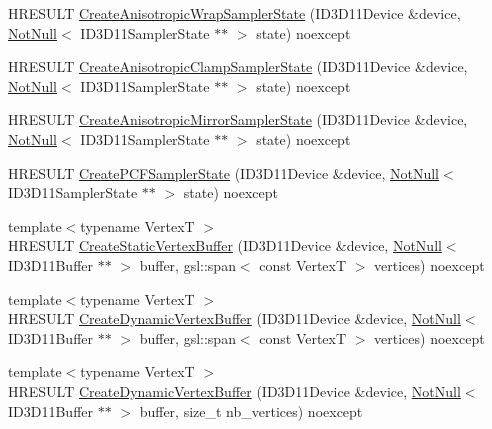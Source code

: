 \begin{DoxyCompactItemize}
\item 
H\+R\+E\+S\+U\+LT \mbox{\hyperlink{namespacemage_1_1rendering_a095bd9e1ca72cd2a27c49f901bb4ea89}{Create\+Anisotropic\+Wrap\+Sampler\+State}} (I\+D3\+D11\+Device \&device, \mbox{\hyperlink{namespacemage_a8769f9d670d6b585ea306cb1062af94b}{Not\+Null}}$<$ I\+D3\+D11\+Sampler\+State $\ast$$\ast$ $>$ state) noexcept
\item 
H\+R\+E\+S\+U\+LT \mbox{\hyperlink{namespacemage_1_1rendering_a84f8d95cd6a9774ff39ee3ec278973ae}{Create\+Anisotropic\+Clamp\+Sampler\+State}} (I\+D3\+D11\+Device \&device, \mbox{\hyperlink{namespacemage_a8769f9d670d6b585ea306cb1062af94b}{Not\+Null}}$<$ I\+D3\+D11\+Sampler\+State $\ast$$\ast$ $>$ state) noexcept
\item 
H\+R\+E\+S\+U\+LT \mbox{\hyperlink{namespacemage_1_1rendering_a408271395f60644294efde7390c1df1e}{Create\+Anisotropic\+Mirror\+Sampler\+State}} (I\+D3\+D11\+Device \&device, \mbox{\hyperlink{namespacemage_a8769f9d670d6b585ea306cb1062af94b}{Not\+Null}}$<$ I\+D3\+D11\+Sampler\+State $\ast$$\ast$ $>$ state) noexcept
\item 
H\+R\+E\+S\+U\+LT \mbox{\hyperlink{namespacemage_1_1rendering_abb78ea9d1e7925cef40e2865cd726b78}{Create\+P\+C\+F\+Sampler\+State}} (I\+D3\+D11\+Device \&device, \mbox{\hyperlink{namespacemage_a8769f9d670d6b585ea306cb1062af94b}{Not\+Null}}$<$ I\+D3\+D11\+Sampler\+State $\ast$$\ast$ $>$ state) noexcept
\item 
{\footnotesize template$<$typename VertexT $>$ }\\H\+R\+E\+S\+U\+LT \mbox{\hyperlink{namespacemage_1_1rendering_af9ed5791a6fbd9fc54870625efb66943}{Create\+Static\+Vertex\+Buffer}} (I\+D3\+D11\+Device \&device, \mbox{\hyperlink{namespacemage_a8769f9d670d6b585ea306cb1062af94b}{Not\+Null}}$<$ I\+D3\+D11\+Buffer $\ast$$\ast$ $>$ buffer, gsl\+::span$<$ const VertexT $>$ vertices) noexcept
\item 
{\footnotesize template$<$typename VertexT $>$ }\\H\+R\+E\+S\+U\+LT \mbox{\hyperlink{namespacemage_1_1rendering_af0e636c68cb76d840621730d394231bb}{Create\+Dynamic\+Vertex\+Buffer}} (I\+D3\+D11\+Device \&device, \mbox{\hyperlink{namespacemage_a8769f9d670d6b585ea306cb1062af94b}{Not\+Null}}$<$ I\+D3\+D11\+Buffer $\ast$$\ast$ $>$ buffer, gsl\+::span$<$ const VertexT $>$ vertices) noexcept
\item 
{\footnotesize template$<$typename VertexT $>$ }\\H\+R\+E\+S\+U\+LT \mbox{\hyperlink{namespacemage_1_1rendering_ac7756dee2edf6170e29ff49e0a4537d8}{Create\+Dynamic\+Vertex\+Buffer}} (I\+D3\+D11\+Device \&device, \mbox{\hyperlink{namespacemage_a8769f9d670d6b585ea306cb1062af94b}{Not\+Null}}$<$ I\+D3\+D11\+Buffer $\ast$$\ast$ $>$ buffer, size\+\_\+t nb\+\_\+vertices) noexcept
$$
\end{DoxyCompactItemize}
